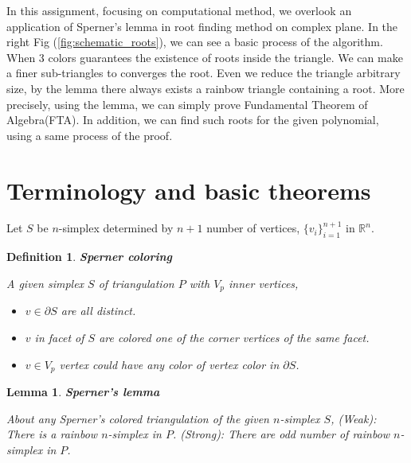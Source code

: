 \documentclass[a4paper,12pt]{article}
\newtheorem{lemma}{Lemma}
\newtheorem{definition}{Definition}
\begin{document}
\vspace{0.5cm}
{
\noindent
\begin{minipage}{0.45\textwidth} %
    \noindent
In this assignment, focusing on computational method,
we overlook an application of Sperner's lemma in root finding method 
on complex plane. 
In the right Fig (\ref{fig:schematic_roots}), 
we can see a basic process of the algorithm. 
When 3 colors guarantees the existence of roots
inside the triangle. We can make a finer sub-triangles
to converges the root. Even we reduce the triangle arbitrary size,
by the lemma there always exists a rainbow triangle containing a root.
More precisely, using the lemma, we can simply prove 
Fundamental Theorem of Algebra(FTA)\cite{Huang2004ONTS}.
In addition, we can find such roots for the given polynomial, using a same process
of the proof.
\end{minipage}%
\hfill %
}
\section{Terminology and basic theorems}

Let $S$ be $n$-simplex determined by $n+1$ number of vertices, $\{v_i\}_{i=1}^{n+1}$ in $\mathbb{R}^n$.
\begin{definition}\textbf{Sperner coloring}

    A given simplex $S$ of triangulation $P$ with $V_p$ inner vertices,
    \begin{itemize}
        \item $v \in \partial S$ are all distinct.
        \item $v$ in facet of $S$ are colored one of the corner vertices of the same facet.
        \item $v \in V_p$ vertex could have any color of vertex color in $\partial S$.
    \end{itemize}
\end{definition}

\begin{lemma}\textbf{Sperner's lemma}

    About any Sperner's colored triangulation of the given $n$-simplex $S$,
    (Weak): There is a rainbow $n$-simplex in $P$.
    (Strong): There are odd number of rainbow $n$-simplex in $P$.
\end{lemma}
\end{document}
